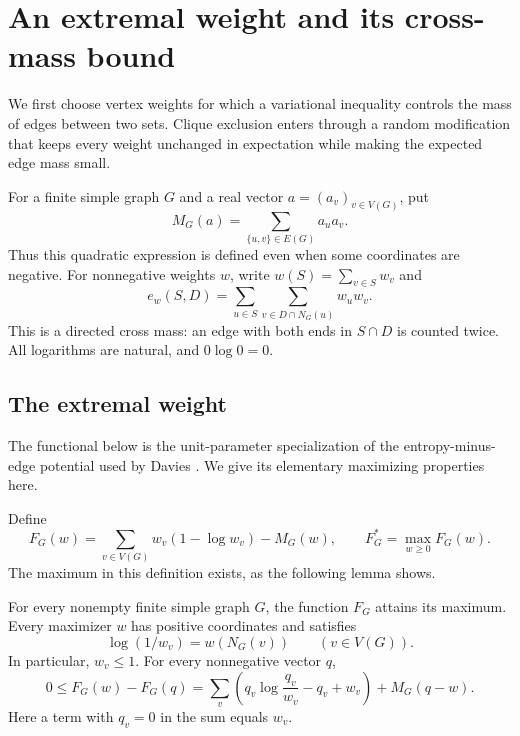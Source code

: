 \section{An extremal weight and its cross-mass bound}
\label{sec:optimizer}

We first choose vertex weights for which a variational inequality controls
the mass of edges between two sets.  Clique exclusion enters through a
random modification that keeps every weight unchanged in expectation while
making the expected edge mass small.

For a finite simple graph $G$ and a real vector $a=(a_v)_{v\in V(G)}$, put
\[
 M_G(a)=\sum_{\{u,v\}\in E(G)}a_ua_v.
\]
Thus this quadratic expression is defined even when some coordinates are
negative.  For nonnegative weights $w$, write $w(S)=\sum_{v\in S}w_v$ and
\[
 e_w(S,D)=\sum_{u\in S}\sum_{v\in D\cap N_G(u)}w_uw_v.
\]
This is a directed cross mass: an edge with both ends in $S\cap D$ is
counted twice.  All logarithms are natural, and $0\log 0=0$.

\subsection{The extremal weight}

The functional below is the unit-parameter specialization of the
entropy-minus-edge potential used by Davies
\cite[Section~3.3, proof of Theorem~17]{Davies2026}.
We give its elementary maximizing properties here.

Define
\[
 F_G(w)=\sum_{v\in V(G)}w_v(1-\log w_v)-M_G(w),
 \qquad F_G^*=\max_{w\ge0}F_G(w).
\]
The maximum in this definition exists, as the following lemma shows.

\begin{lemma}\label{lem:optimizer}
For every nonempty finite simple graph $G$, the function $F_G$ attains its
maximum.  Every maximizer $w$ has positive coordinates and satisfies
\begin{equation}\label{eq:stationarity}
 \log(1/w_v)=w(N_G(v)) \qquad(v\in V(G)).
\end{equation}
In particular, $w_v\le1$.  For every nonnegative vector $q$,
\begin{equation}\label{eq:optimizer-divergence}
 0\le F_G(w)-F_G(q)
 =\sum_v\left(q_v\log\frac{q_v}{w_v}-q_v+w_v\right)
   +M_G(q-w).
\end{equation}
Here a term with $q_v=0$ in the sum equals $w_v$.
\end{lemma}


